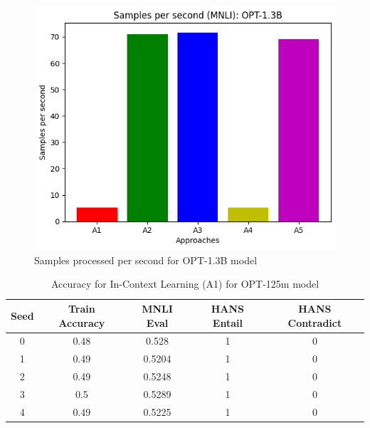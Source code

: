 \documentclass[10pt,twocolumn,letterpaper]{article}
\begin{document}
\begin{figure}[h!]
\begin{center}
\includegraphics[width=0.8\linewidth]{figures/samples-opt1_3B.png}
\end{center}
\caption{Samples processed per second for OPT-1.3B model}
\end{figure}



\begin{table}[h!]
\begin{center}
\begin{tabular}{|c|c|c|c|c|}
\hline
\textbf{Seed} & \textbf{Train Accuracy} & \textbf{MNLI Eval} & \textbf{HANS Entail} & \textbf{HANS Contradict} \\
\hline
\hline
0 & 0.48 & 0.528 & 1 & 0 \\
1 & 0.49 & 0.5204 & 1 & 0 \\
2 & 0.49 & 0.5248 & 1 & 0 \\
3 & 0.5 & 0.5289 & 1 & 0 \\
4 & 0.49 & 0.5225 & 1 & 0 \\
\hline
\end{tabular}
\end{center}
\caption{Accuracy for In-Context Learning (A1) for OPT-125m model}
\end{table}

\end{document}
